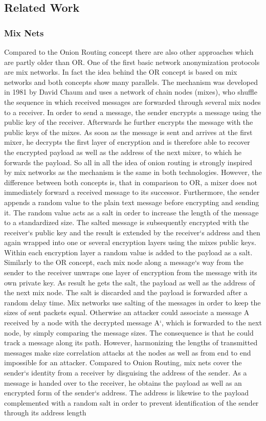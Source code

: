 \documentclass{sig-alternate}
\begin{document}
\subsection {Related Work}
 \subsubsection {Mix Nets}
Compared to the Onion Routing concept there are also other approaches which are partly older than OR. One of the first basic network anonymization protocols are mix networks\cite{chaum1981untraceable}. In fact the idea behind the OR concept is based on mix networks and both concepts show many parallels. The mechanism was developed in 1981 by David Chaum and uses a network of chain nodes (mixes), who shuffle the sequence in which received messages are forwarded through several mix nodes to a receiver. In order to send a message, the sender encrypts a message using the public key of the receiver. Afterwards he further encrypts the message with the public keys of the mixes. As soon as the message is sent and arrives at the first mixer, he decrypts the first layer of encryption and is therefore able to recover the encrypted payload as well as the address of the next mixer, to which he forwards the payload. So all in all the idea of onion routing is strongly inspired by mix networks as the mechanism is the same in both technologies. However, the difference between both concepts is, that in comparison to OR, a mixer does not immediately forward a received message to its successor. Furthermore, the sender appends a random value to the plain text message before encrypting and sending it. The random value acts as a salt in order to increase the length of the message to a standardized size. The salted message is subsequently encrypted with the receiver`s public key and the result is extended by the receiver`s address and then again wrapped into one or several encryption layers using the mixes public keys. Within each encryption layer a random value is added to the payload as a salt. Similarly to the OR concept, each mix node along a message`s way from the sender to the receiver unwraps one layer of encryption from the message with its own private key. As result he gets the salt, the payload as well as the address of the next mix node. The salt is discarded and the payload is forwarded after a random delay time. Mix networks use salting of the messages in order to keep the sizes of sent packets equal. Otherwise an attacker could associate a message A received by a node with the decrypted message A`, which is forwarded to the next node, by simply comparing the message sizes. The consequence is that he could track a message along its path. However, harmonizing the lengths of transmitted messages make size correlation attacks at the nodes as well as from end to end impossible for an attacker. Compared to Onion Routing, mix nets cover the sender`s identity from a receiver by disguising the address of the sender. As a message is handed over to the receiver, he obtains the payload as well as an encrypted form of the sender`s address. The address is likewise to the payload complemented with a random salt in order to prevent identification of the sender through its address length 
\end{document}
